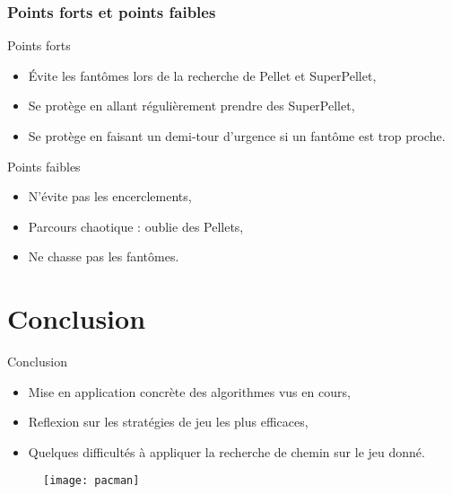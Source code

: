 \documentclass[c]{beamer}
\begin{document}
\begin{frame}
    \frametitle{Points forts et points faibles}
    \begin{block}{Points forts}
        \begin{itemize}
            \item Évite les fantômes lors de la recherche de Pellet et SuperPellet,
            \item Se protège en allant régulièrement prendre des SuperPellet,
            \item Se protège en faisant un demi-tour d'urgence si un fantôme est trop proche.
        \end{itemize}
    \end{block}
    \begin{block}{Points faibles}
        \begin{itemize}
            \item N'évite pas les encerclements,
            \item Parcours chaotique : oublie des Pellets,
            \item Ne chasse pas les fantômes.
        \end{itemize}
    \end{block}
\end{frame}




\section{Conclusion}
\begin{frame}
  \begin{block}{Conclusion}
      \begin{itemize}
          \item Mise en application concrète des algorithmes vus en cours,
          \item Reflexion sur les stratégies de jeu les plus efficaces,
          \item Quelques difficultés à appliquer la recherche de chemin sur le jeu donné.
      \end{itemize}
  \end{block}
  \begin{figure}
      \texttt{[image: pacman]}
  \end{figure}
\end{frame}
\end{document}
